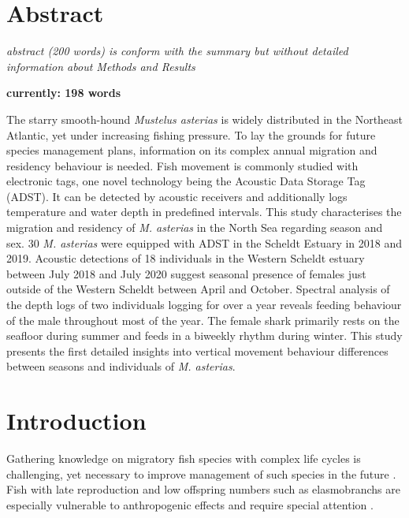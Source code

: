 \documentclass[
  authoryear,
  review,
  3p]{elsarticle}
\begin{document}
\hypertarget{abstract}{%
\section{Abstract}\label{abstract}}

\emph{abstract (200 words) is conform with the summary but without
detailed information about Methods and Results}

\textbf{currently: 198 words}

The starry smooth-hound \emph{Mustelus asterias} is widely distributed
in the Northeast Atlantic, yet under increasing fishing pressure. To lay
the grounds for future species management plans, information on its
complex annual migration and residency behaviour is needed. Fish
movement is commonly studied with electronic tags, one novel technology
being the Acoustic Data Storage Tag (ADST). It can be detected by
acoustic receivers and additionally logs temperature and water depth in
predefined intervals. This study characterises the migration and
residency of \emph{M. asterias} in the North Sea regarding season and
sex. 30 \emph{M. asterias} were equipped with ADST in the Scheldt
Estuary in 2018 and 2019. Acoustic detections of 18 individuals in the
Western Scheldt estuary between July 2018 and July 2020 suggest seasonal
presence of females just outside of the Western Scheldt between April
and October. Spectral analysis of the depth logs of two individuals
logging for over a year reveals feeding behaviour of the male throughout
most of the year. The female shark primarily rests on the seafloor
during summer and feeds in a biweekly rhythm during winter. This study
presents the first detailed insights into vertical movement behaviour
differences between seasons and individuals of \emph{M. asterias}.

\hypertarget{sec-intro}{%
\section{Introduction}\label{sec-intro}}

Gathering knowledge on migratory fish species with complex life cycles
is challenging, yet necessary to improve management of such species in
the future \citep{brownscombe_2022}. Fish with late reproduction and low
offspring numbers such as elasmobranchs are especially vulnerable to
anthropogenic effects and require special attention
\citep{stevens_2000}.
\end{document}
